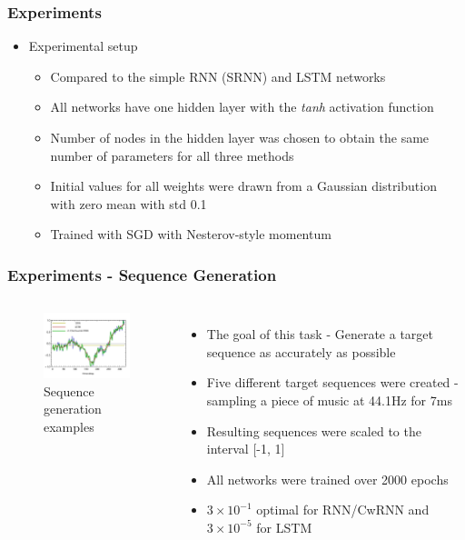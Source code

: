 \documentclass{beamer}
\begin{document}
\frame
{
   \frametitle{Experiments}
   \begin{itemize}
   	\item Experimental setup
   		\begin{itemize}
   			\item Compared to the simple RNN (SRNN) and LSTM networks
   			\item All networks have one hidden layer with the \textit{tanh} activation function
   			\item Number of nodes in the hidden layer was chosen to obtain the same number of parameters for all three methods   			
   			\item Initial values for all weights were drawn from a Gaussian distribution with zero mean with std 0.1
   			\item Trained with SGD with Nesterov-style momentum
   		\end{itemize}
   \end{itemize}
}
\frame
{
   \frametitle{Experiments - Sequence Generation}
   \begin{columns}
		\begin{figure}[ht]  
			\begin{center}
				\includegraphics[width=1.8in]{Images/cwrnn_graph.png}   
			\end{center}   
			\caption{\centering Sequence generation examples}
		\end{figure}
		\begin{itemize}		
			\item The goal of this task - Generate a target sequence as accurately as possible
			\item Five different target sequences were created - sampling a piece of music at 44.1Hz for 7ms
			\item Resulting sequences were scaled to the interval [-1, 1]
			\item All networks were trained over 2000 epochs
			\item ${3\times10^{-1}}$ optimal for RNN/CwRNN and ${3\times10^{-5}}$ for LSTM
		\end{itemize}
	\end{columns}
}
\end{document}
